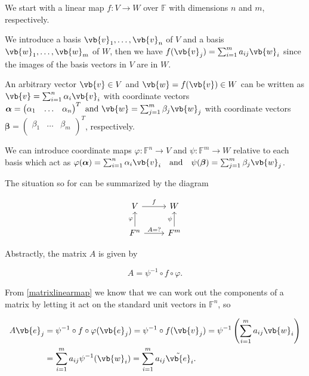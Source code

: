 \documentclass[a4paper,12pt]{report}
\begin{document}
We start with a linear map \(f:V \rightarrow W\) over \(\mathbb{F}\) with dimensions \(n\) and \(m\), respectively. 

We introduce a basis \(\vb{v}_{1}, \ldots, \vb{v}_n \) of \(V\) and a basis \(\vb{w}_{1}, \ldots, \vb{w}_m \) of \(W\), then we have \(f(\vb{v} _{j} ) = \sum_{i=1}^{m} a_{ij} \vb{w} _{i} \) since the images of the basis vectors in \(V\) are in \(W\). 

An arbitrary vector \(\vb{v} \in  V\) and \(\vb{w} = f(\vb{v} ) \in  W\) can be written as \(\vb{v} = \sum_{i=1}^{n} \alpha _{i}\vb{v} _{i}  \) with coordinate vectors \(\boldsymbol{\alpha } = \begin{pmatrix}
    \alpha _{1}  & \ldots  & \alpha _{n}   \\
\end{pmatrix}^{T} \text { and } \vb{w} = \sum_{j=1}^{m} \beta _{j} \vb{w} _{j}   \) with coordinate vectors \(\boldsymbol{\beta } = \begin{pmatrix}
    \beta _{1}  & \ldots  & \beta _{m}   \\
\end{pmatrix}^{T} \), respectively. 

We can introduce coordinate maps \(\varphi : \mathbb{F}^{n} \rightarrow V \) and \(\psi  :\mathbb{F}^{m} \rightarrow W\) relative to each basis which act as \(\varphi (\boldsymbol{\alpha } ) = \sum_{i=1}^{n} \alpha _{i} \vb{v} _{i} \text {~~ and ~~} \psi (\boldsymbol{\beta } ) = \sum_{j=1}^{m} \beta _{j} \vb{w} _{j}\).


The situation so for can be summarized by the diagram

\begin{equation}
    \begin{tikzcd}
        V \arrow[r, "f"] & W \\
        F^n \arrow[u, "\varphi"] \arrow[r, "A{=}?"] & F^m \arrow[u, "\psi"]
    \end{tikzcd}
\end{equation}

Abstractly, the matrix \(A\) is given by  

\begin{equation}
    A = \psi ^{-1} \circ f \circ \varphi.
\end{equation}

From \cref{matrixlinearmap} we know that we can work out the components of a matrix by letting it act on the standard unit vectors in \(\mathbb{F}^{n} \), so

\begin{equation}  
    \begin{aligned}
    A\vb{e} _{j} &= \psi ^{-1} \circ f \circ \varphi (\vb{e} _{j} ) =\psi ^{-1} \circ f(\vb{v} _{j} ) = \psi ^{-1} \left( \sum_{i=1}^{m} a_{ij}\vb{w} _{i}   \right) \\ &= \sum_{i=1}^{m} a_{ij} \psi ^{-1} (\vb{w} _{i} ) = \sum_{i=1}^{m} a_{ij}\tilde{\vb{e} }_{i}.     
    \end{aligned}
\end{equation}
\end{document}
